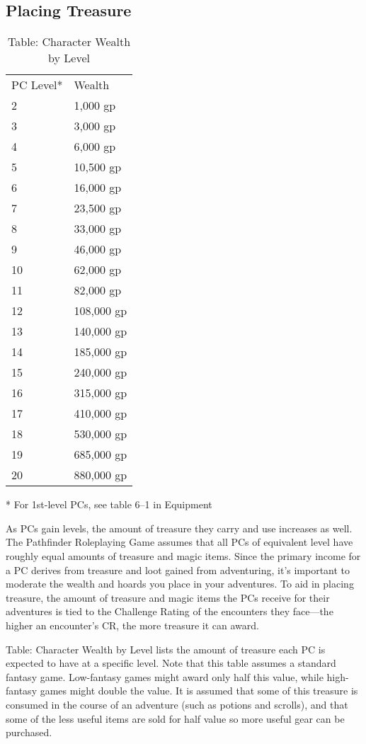 \subsection{Placing Treasure}

\begin{table}[]
\sffamily
\caption{Table: Character Wealth by Level}
\begin{tabularx}{\linewidth}{lX}
PC Level* & Wealth\\
2 & 1,000 gp \\
 3 & 3,000 gp \\
 4 & 6,000 gp \\
 5 & 10,500 gp \\
 6 & 16,000 gp \\
 7 & 23,500 gp \\
 8 & 33,000 gp \\
 9 & 46,000 gp \\
 10 & 62,000 gp \\
 11 & 82,000 gp \\
 12 & 108,000 gp \\
 13 & 140,000 gp \\
 14 & 185,000 gp \\
 15 & 240,000 gp \\
 16 & 315,000 gp \\
 17 & 410,000 gp \\
 18 & 530,000 gp \\
 19 & 685,000 gp \\
 20 & 880,000 gp\\
\end{tabularx}
* For 1st-level PCs, see table 6--1 in Equipment
\end{table}

As PCs gain levels, the amount of treasure they carry and use increases as well. The Pathfinder Roleplaying Game assumes that all PCs of equivalent level have roughly equal amounts of treasure and magic items. Since the primary income for a PC derives from treasure and loot gained from adventuring, it's important to moderate the wealth and hoards you place in your adventures. To aid in placing treasure, the amount of treasure and magic items the PCs receive for their adventures is tied to the Challenge Rating of the encounters they face---the higher an encounter's CR, the more treasure it can award.
				
Table: Character Wealth by Level lists the amount of treasure each PC is expected to have at a specific level. Note that this table assumes a standard fantasy game. Low-fantasy games might award only half this value, while high-fantasy games might double the value. It is assumed that some of this treasure is consumed in the course of an adventure (such as potions and scrolls), and that some of the less useful items are sold for half value so more useful gear can be purchased. 
				
